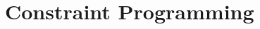 \documentclass[11pt]{article}
\begin{document}
\clearpage

\section{Constraint Programming}






\end{document}
